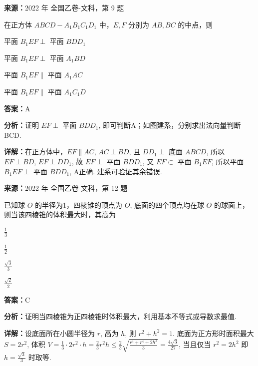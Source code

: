 \begin{question}[points=5]
\textbf{来源：}2022 年 全国乙卷-文科，第 9 题\par
在正方体 $ABCD-A_1B_1C_1D_1$ 中，$E,F$ 分别为 $AB, BC$ 的中点，则
\begin{choices}
  \item 平面 $B_1EF \perp$ 平面 $BDD_1$
  \item 平面 $B_1EF \perp$ 平面 $A_1BD$
  \item 平面 $B_1EF \parallel$ 平面 $A_1AC$
  \item 平面 $B_1EF \parallel$ 平面 $A_1C_1D$
\end{choices}
\begin{solution}
\textbf{答案：}A

\textbf{分析：}证明 $EF \perp$ 平面 $BDD_1$, 即可判断A；如图建系，分别求出法向量判断BCD.

\textbf{详解：}在正方体中，$EF \parallel AC$, $AC \perp BD$, 且 $DD_1 \perp$ 底面 $ABCD$, 所以 $EF \perp BD$, $EF \perp DD_1$, 故 $EF \perp$ 平面 $BDD_1$, 又 $EF \subset$ 平面 $B_1EF$, 所以平面 $B_1EF \perp$ 平面 $BDD_1$, A正确. 建系可验证其余错误.
\end{solution}
\end{question}

\begin{question}[points=5]
\textbf{来源：}2022 年 全国乙卷-文科，第 12 题\par
已知球 $O$ 的半径为1，四棱锥的顶点为 $O$, 底面的四个顶点均在球 $O$ 的球面上，则当该四棱锥的体积最大时，其高为
\begin{choices}
  \item $\frac{1}{3}$
  \item $\frac{1}{2}$
  \item $\frac{\sqrt{3}}{3}$
  \item $\frac{\sqrt{2}}{2}$
\end{choices}
\begin{solution}
\textbf{答案：}C

\textbf{分析：}证明当四棱锥为正四棱锥时体积最大，利用基本不等式或导数求最值.

\textbf{详解：}设底面所在小圆半径为 $r$, 高为 $h$, 则 $r^2+h^2=1$. 底面为正方形时面积最大 $S=2r^2$, 体积 $V=\frac13\cdot2r^2\cdot h = \frac23 r^2 h \le \frac23 \sqrt{\frac{r^4+r^4+2h^2}{3}} = \frac{4\sqrt{3}}{27}$, 当且仅当 $r^2=2h^2$ 即 $h=\frac{\sqrt{3}}{3}$ 时取等.
\end{solution}
\end{question}

